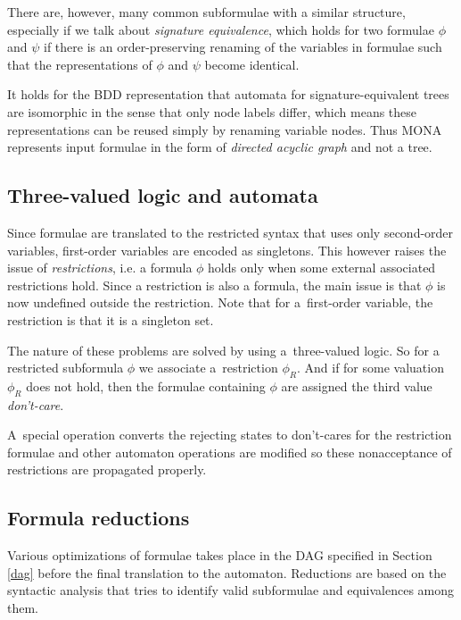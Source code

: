 There are, however, many common subformulae with a similar structure, especially
if we talk about \emph{signature equivalence}, which holds for two formulae $\phi$
and $\psi$ if there is an order-preserving renaming of the variables in formulae
such that the representations of $\phi$ and $\psi$ become identical.

It holds for the BDD representation that automata for signature-equivalent trees
are isomorphic in the sense that only node labels differ, which means these
representations can be reused simply by renaming variable nodes. Thus MONA
represents input formulae in the form of \emph{directed acyclic graph} and not a
tree.
\newpage
\subsection{Three-valued logic and automata}
Since formulae are translated to the restricted syntax that uses only
second-order variables, first-order variables are encoded as singletons. This
however raises the issue of \emph{restrictions}, i.e. a formula $\phi$ holds
only when some external associated restrictions hold. Since a restriction is
also a formula, the main issue is that $\phi$ is now undefined outside the
restriction. Note that for a~first-order variable, the restriction is that it is
a singleton set.

The nature of these problems are solved by using a~three-valued logic. So for a
restricted subformula $\phi$ we associate a~restriction $\phi_R$. And if for
some valuation $\phi_R$ does not hold, then the formulae containing $\phi$ are
assigned the third value \emph{don't-care}.

A~special operation converts the rejecting states to don't-cares for the
restriction formulae and other automaton operations are modified so these
nonacceptance of restrictions are propagated properly.

\subsection{Formula reductions}
Various optimizations of formulae takes place in the DAG specified in Section
\ref{dag} before the final translation to the automaton. Reductions are based on
the syntactic analysis that tries to identify valid subformulae and equivalences
among them.

